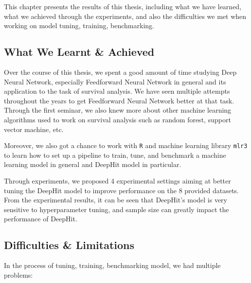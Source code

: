 \documentclass[
]{article}
\newenvironment{Shaded}{\begin{snugshade}}{\end{snugshade}}
\newcommand{\ControlFlowTok}[1]{\textcolor[rgb]{0.13,0.29,0.53}{\textbf{#1}}}
\newcommand{\DecValTok}[1]{\textcolor[rgb]{0.00,0.00,0.81}{#1}}
\newcommand{\FunctionTok}[1]{\textcolor[rgb]{0.00,0.00,0.00}{#1}}
\newcommand{\NormalTok}[1]{#1}
\newcommand{\SpecialCharTok}[1]{\textcolor[rgb]{0.00,0.00,0.00}{#1}}
\begin{document}
This chapter presents the results of this thesis, including what we have learned, what we achieved through the experiments, and also the difficulties we met when working on model tuning, training, benchmarking.

\hypertarget{what-we-learnt-achieved}{%
\subsection{What We Learnt \& Achieved}\label{what-we-learnt-achieved}}

Over the course of this thesis, we spent a good amount of time studying Deep Neural Network, especially Feedforward Neural Network in general and its application to the task of survival analysis. We have seen multiple attempts throughout the years to get Feedforward Neural Network better at that task. Through the first seminar, we also knew more about other machine learning algorithms used to work on survival analysis such as random forest, support vector machine, etc.

Moreover, we also got a chance to work with \texttt{R} and machine learning library \texttt{mlr3} to learn how to set up a pipeline to train, tune, and benchmark a machine learning model in general and DeepHit model in particular.

Through experiments, we proposed 4 experimental settings aiming at better tuning the DeepHit model to improve performance on the 8 provided datasets. From the experimental results, it can be seen that DeepHit's model is very sensitive to hyperparameter tuning, and sample size can greatly impact the performance of DeepHit.

\hypertarget{difficulties-limitations}{%
\subsection{Difficulties \& Limitations}\label{difficulties-limitations}}

In the process of tuning, training, benchmarking model, we had multiple problems:

\begin{Shaded}
\end{Shaded}
\end{document}
